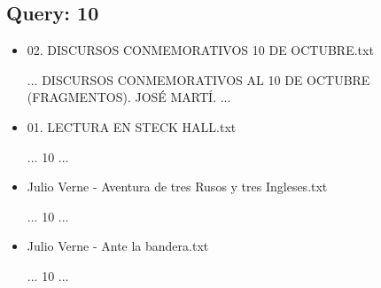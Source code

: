 \documentclass[a4paper,12pt,]{article}
\begin{document}
\subsection*{Query: 10}
\begin{itemize}
    \item 02. DISCURSOS CONMEMORATIVOS 10 DE OCTUBRE.txt
    
    ... DISCURSOS CONMEMORATIVOS AL 10 DE OCTUBRE (FRAGMENTOS). JOSÉ MARTÍ. ...

    \item 01. LECTURA EN STECK HALL.txt
    
    ... 10 ...

    \item Julio Verne - Aventura de tres Rusos y tres Ingleses.txt
    
    ... 10 ...

    \item Julio Verne - Ante la bandera.txt
    
    ... 10 ...
\end{itemize}
\end{document}

